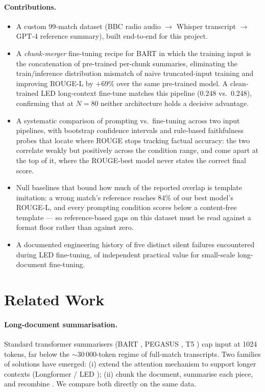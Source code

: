 \documentclass[10pt,a4paper]{article}
\begin{document}
\paragraph{Contributions.}
\begin{itemize}[leftmargin=*,itemsep=2pt,topsep=2pt]
\item A custom 99-match dataset (BBC radio audio $\to$ Whisper transcript $\to$ GPT-4 reference summary), built end-to-end for this project.
\item A \emph{chunk-merger} fine-tuning recipe for BART in which the training input is the concatenation of pre-trained per-chunk summaries, eliminating the train/inference distribution mismatch of naive truncated-input training and improving ROUGE-L by $+69\%$ over the same pre-trained model. A clean-trained LED long-context fine-tune matches this pipeline (0.248 vs.\ 0.248), confirming that at $N=80$ neither architecture holds a decisive advantage.
\item A systematic comparison of prompting vs.\ fine-tuning across two input pipelines, with bootstrap confidence intervals and rule-based faithfulness probes that locate where ROUGE stops tracking factual accuracy: the two correlate weakly but positively across the condition range, and come apart at the top of it, where the ROUGE-best model never states the correct final score.
\item Null baselines that bound how much of the reported overlap is template imitation: a wrong match's reference reaches 84\% of our best model's ROUGE-L, and every prompting condition scores below a content-free template --- so reference-based gaps on this dataset must be read against a format floor rather than against zero.
\item A documented engineering history of five distinct silent failures encountered during LED fine-tuning, of independent practical value for small-scale long-document fine-tuning.
\end{itemize}

\section{Related Work}

\paragraph{Long-document summarisation.}
Standard transformer summarisers (BART \citep{lewis2020bart}, PEGASUS \citep{zhang2020pegasus}, T5 \citep{raffel2020t5}) cap input at 1024 tokens, far below the $\sim$30\,000-token regime of full-match transcripts. Two families of solutions have emerged: (i) extend the attention mechanism to support longer contexts (Longformer / LED \citep{beltagy2020longformer}); (ii) chunk the document, summarise each piece, and recombine \citep{see2017pointer}. We compare both directly on the same data.
\end{document}

